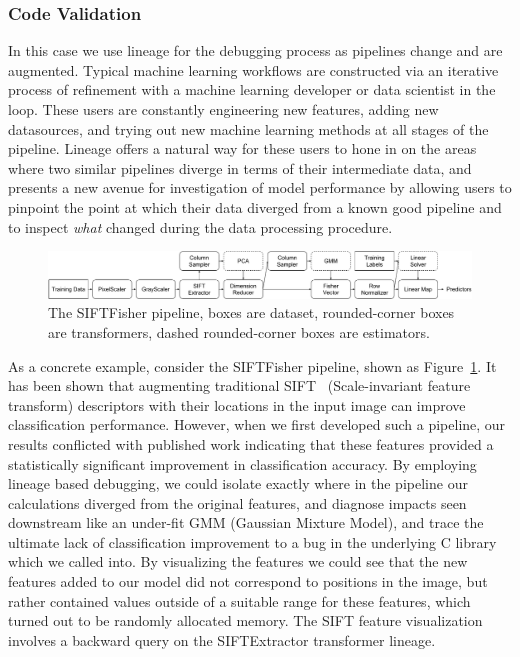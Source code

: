 \documentclass{sig-alternate}
\begin{document}
\subsubsection{Code Validation}
In this case we use lineage for the debugging process as pipelines change and are augmented. 
Typical machine learning workflows are constructed via an iterative process of refinement with a machine learning developer or data scientist in the loop.
These users are constantly engineering new features, adding new datasources, and trying out new machine learning methods at all stages of the pipeline.
Lineage offers a natural way for these users to hone in on the areas where two similar pipelines diverge in terms of their intermediate data, and presents a new avenue for investigation of model performance by allowing users to pinpoint the point at which their data diverged from a known good pipeline and to inspect \emph{what} changed during the data processing procedure. 


\begin{figure}[t]
\begin{center}
    \includegraphics[width=150mm]{pictures/VOCSIFTFisher}
    \caption {The SIFTFisher pipeline, boxes are dataset, rounded-corner boxes are transformers, dashed rounded-corner boxes are estimators.
    \label{fig:vocsiftfisher}
}
\end{center}
\end{figure}

As a concrete example, consider the SIFTFisher pipeline, shown as Figure~\ref{fig:vocsiftfisher}. 
It has been shown that augmenting traditional SIFT~\cite{lowe99} (Scale-invariant feature transform) descriptors 
with their locations in the input image can improve classification performance.
However, when we first developed such a pipeline, our results conflicted with published work indicating that these features provided a statistically significant improvement in classification accuracy.
By employing lineage based debugging, we could isolate exactly where in the pipeline our calculations diverged from the original features, and diagnose impacts seen downstream like an under-fit GMM (Gaussian Mixture Model), and trace the ultimate lack of classification improvement to a bug in the underlying C library which we called into.
By visualizing the features we could see that the new features added to our model did not correspond to positions in the image, but rather contained values outside of a suitable range for these features, which turned out to be randomly allocated memory. 
The SIFT feature visualization involves a  backward query on the SIFTExtractor transformer lineage. 
\end{document}
